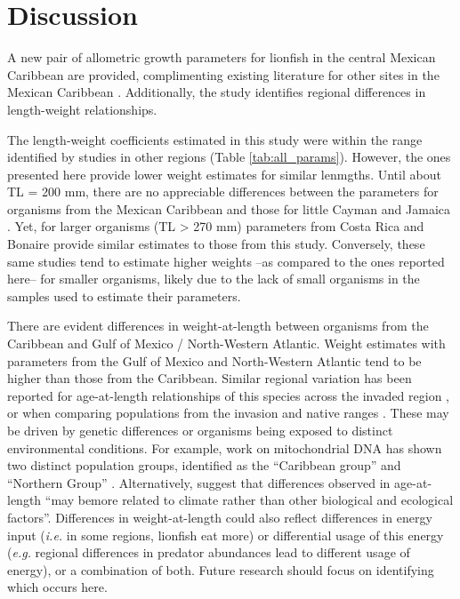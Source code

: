 \documentclass[fleqn,10pt,lineno]{wlpeerj} %
\begin{document}
\clearpage

\section*{Discussion}

A new pair of allometric growth parameters for lionfish in the central
Mexican Caribbean are provided, complimenting existing literature for
other sites in the Mexican Caribbean
\citep{sabidoitza_2016,sabidoitz_2016}. Additionally, the study
identifies regional differences in length-weight relationships.

The length-weight coefficients estimated in this study were within the
range identified by studies in other regions (Table
\ref{tab:all_params}). However, the ones presented here provide lower
weight estimates for similar lenmgths. Until about TL = 200 mm, there
are no appreciable differences between the parameters for organisms from
the Mexican Caribbean and those for little Cayman \citep{edwards_2014}
and Jamaica \citep{chin_2016}. Yet, for larger organisms (TL
\textgreater{} 270 mm) parameters from Costa Rica \citep{sandel_2015}
and Bonaire \citep{deleon_2013} provide similar estimates to those from
this study. Conversely, these same studies tend to estimate higher
weights --as compared to the ones reported here-- for smaller organisms,
likely due to the lack of small organisms in the samples used to
estimate their parameters.

There are evident differences in weight-at-length between organisms from
the Caribbean and Gulf of Mexico / North-Western Atlantic. Weight
estimates with parameters from the Gulf of Mexico and North-Western
Atlantic tend to be higher than those from the Caribbean. Similar
regional variation has been reported for age-at-length relationships of
this species across the invaded region \citep{fogg_2015,edwards_2014},
or when comparing populations from the invasion and native ranges
\citep{pusack_2016}. These may be driven by genetic differences or
organisms being exposed to distinct environmental conditions. For
example, work on mitochondrial DNA has shown two distinct population
groups, identified as the ``Caribbean group'' and ``Northern Group''
\citep{betancurr_2011}. Alternatively, \citet{fogg_2015} suggest that
differences observed in age-at-length ``may bemore related to climate
rather than other biological and ecological factors''. Differences in
weight-at-length could also reflect differences in energy input
(\emph{i.e.} in some regions, lionfish eat more) or differential usage
of this energy (\emph{e.g.} regional differences in predator abundances
lead to different usage of energy), or a combination of both. Future
research should focus on identifying which occurs here.
\end{document}
